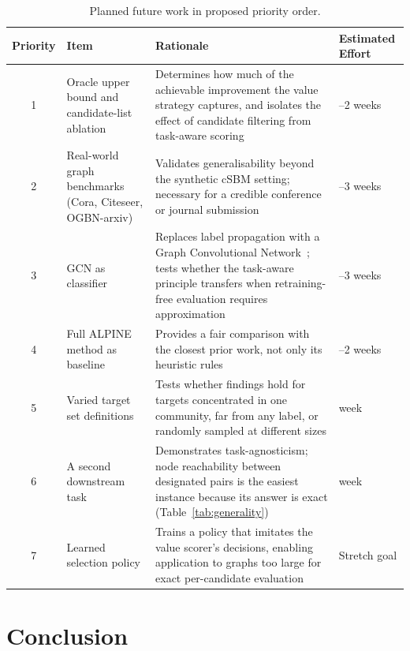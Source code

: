 \documentclass[11pt,a4paper]{article}
\begin{document}
\begin{table}[htbp]
\centering
\caption{Planned future work in proposed priority order.}
\label{tab:plan}
\small
\begin{tabularx}{\textwidth}{c>{\raggedright\arraybackslash}p{4.0cm}>{\raggedright\arraybackslash}X>{\raggedright\arraybackslash}p{2.2cm}}
\toprule
Priority & Item & Rationale & Estimated Effort\\
\midrule
1 & Oracle upper bound and candidate-list ablation & Determines how much of the achievable improvement the value strategy captures, and isolates the effect of candidate filtering from task-aware scoring & 1--2 weeks\\
2 & Real-world graph benchmarks (Cora, Citeseer, OGBN-arxiv) & Validates generalisability beyond the synthetic cSBM setting; necessary for a credible conference or journal submission & 2--3 weeks\\
3 & GCN as classifier & Replaces label propagation with a Graph Convolutional Network~\cite{kipf}; tests whether the task-aware principle transfers when retraining-free evaluation requires approximation & 2--3 weeks\\
4 & Full ALPINE method as baseline & Provides a fair comparison with the closest prior work, not only its heuristic rules & 1--2 weeks\\
5 & Varied target set definitions & Tests whether findings hold for targets concentrated in one community, far from any label, or randomly sampled at different sizes & 1 week\\
6 & A second downstream task & Demonstrates task-agnosticism; node reachability between designated pairs is the easiest instance because its answer is exact (Table~\ref{tab:generality}) & 1 week\\
7 & Learned selection policy & Trains a policy that imitates the value scorer's decisions, enabling application to graphs too large for exact per-candidate evaluation & Stretch goal\\
\bottomrule
\end{tabularx}
\end{table}

\section{Conclusion}
\end{document}
